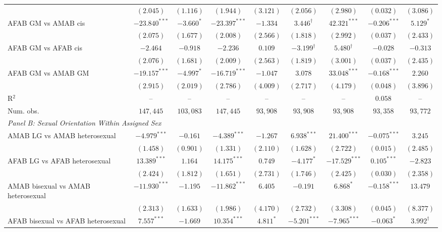\begin{table}[htpb!]
{\begin{tabular}{l c c c c c c c c}
 & $(2.045)$ & $(1.116)$ & $(1.944)$ & $(3.121)$ & $(2.056)$ & $(2.980)$ & $(0.032)$ & $(3.086)$ \\
AFAB GM vs AMAB cis & $-23.840^{***}$ & $-3.660^{*}$ & $-23.397^{***}$ & $-1.334$ & $3.446^{\dagger}$ & $42.321^{***}$ & $-0.206^{***}$ & $5.129^{*}$ \\
 & $(2.075)$ & $(1.677)$ & $(2.008)$ & $(2.566)$ & $(1.818)$ & $(2.992)$ & $(0.037)$ & $(2.433)$ \\
AFAB GM vs AFAB cis & $-2.464$ & $-0.918$ & $-2.236$ & $0.109$ & $-3.199^{\dagger}$ & $5.480^{\dagger}$ & $-0.028$ & $-0.313$ \\
 & $(2.076)$ & $(1.681)$ & $(2.009)$ & $(2.563)$ & $(1.819)$ & $(3.001)$ & $(0.037)$ & $(2.435)$ \\
AFAB GM vs AMAB GM & $-19.157^{***}$ & $-4.997^{*}$ & $-16.719^{***}$ & $-1.047$ & $3.078$ & $33.048^{***}$ & $-0.168^{***}$ & $2.260$ \\
 & $(2.915)$ & $(2.019)$ & $(2.786)$ & $(4.009)$ & $(2.717)$ & $(4.179)$ & $(0.048)$ & $(3.896)$ \\
\hline
R$^2$ & -- & -- & -- & -- & -- & -- & $0.058$ & -- \\
Num. obs. & $147,445$ & $103,083$ & $147,445$ & $93,908$ & $93,908$ & $93,908$ & $93,358$ & $93,772$ \\
\hline
\multicolumn{9}{l}{\textit{Panel B: Sexual Orientation Within Assigned Sex}} \\
AMAB LG vs AMAB heterosexual & $-4.979^{***}$ & $-0.161$ & $-4.389^{***}$ & $-1.267$ & $6.938^{***}$ & $21.400^{***}$ & $-0.075^{***}$ & $3.245$ \\
 & $(1.458)$ & $(0.901)$ & $(1.331)$ & $(2.110)$ & $(1.628)$ & $(2.722)$ & $(0.015)$ & $(2.485)$ \\
AFAB LG vs AFAB heterosexual & $13.389^{***}$ & $1.164$ & $14.175^{***}$ & $0.749$ & $-4.177^{*}$ & $-17.529^{***}$ & $0.105^{***}$ & $-2.823$ \\
 & $(2.424)$ & $(1.812)$ & $(1.651)$ & $(2.731)$ & $(1.746)$ & $(2.425)$ & $(0.030)$ & $(2.358)$ \\
AMAB bisexual vs AMAB heterosexual & $-11.930^{***}$ & $-1.195$ & $-11.862^{***}$ & $6.405$ & $-0.191$ & $6.868^{*}$ & $-0.158^{***}$ & $13.479$ \\
 & $(2.313)$ & $(1.633)$ & $(1.986)$ & $(4.170)$ & $(2.732)$ & $(3.308)$ & $(0.045)$ & $(8.377)$ \\
AFAB bisexual vs AFAB heterosexual & $7.557^{***}$ & $-1.669$ & $10.354^{***}$ & $4.811^{*}$ & $-5.201^{***}$ & $-7.965^{***}$ & $-0.063^{*}$ & $3.992^{\dagger}$ \\

\end{tabular}}
\end{table}
